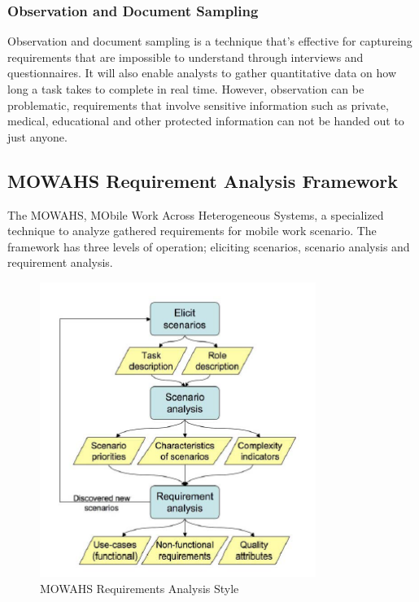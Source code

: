 \subsubsection{Observation and Document Sampling}

Observation and document sampling is a technique that's effective for captureing
requirements that are impossible to understand through interviews and
questionnaires. It will also enable analysts to gather quantitative data on how
long a task takes to complete in real time. However, observation can be
problematic, requirements that involve sensitive information such as private, 
medical, educational and other protected information can not be handed out to just anyone.

\subsection{MOWAHS Requirement Analysis Framework}
The MOWAHS, MObile Work Across Heterogeneous Systems, a specialized technique
to analyze gathered requirements for mobile work scenario. The framework has
three levels of operation; eliciting scenarios, scenario analysis and
requirement analysis.\cite{wiki:MOWAHS}

\begin{figure}[htb]
	\centering
	 \includegraphics[width=0.8\textwidth]{prestudy/mowahs_style.PNG}
	\caption{MOWAHS Requirements Analysis Style}
	\label{fig:mowahs}
\end{figure}


